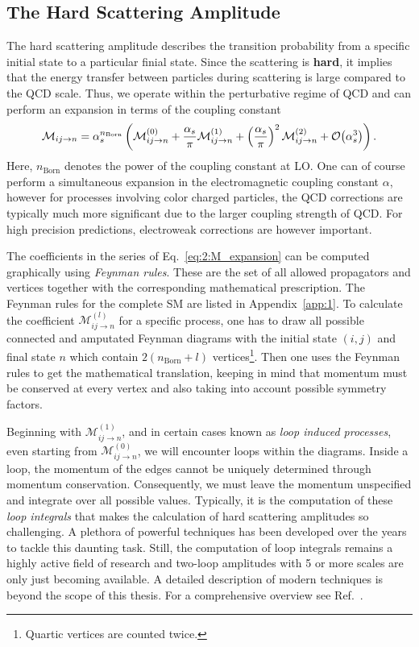 \subsection{The Hard Scattering Amplitude}
The hard scattering amplitude describes the transition probability from a specific initial state to a particular finial state. Since the scattering is \textbf{hard}, it implies that the energy transfer between particles during scattering is large compared to the \acs{QCD} scale. Thus, we operate within the perturbative regime of \acs{QCD} and can perform an expansion in terms of the coupling constant
\begin{equation}
\mathcal{M}_{ij \rightarrow n} = \alpha_s^{n_\text{Born}} \left( \mathcal{M}_{ij \rightarrow n}^{(0)} + \frac{\alpha_s}{\pi} \mathcal{M}_{ij \rightarrow n}^{(1)} + \left(\frac{\alpha_s}{\pi}\right)^2 \mathcal{M}_{ij \rightarrow n}^{(2)} + \mathcal{O}\!\left(\alpha_s^3\right) \right).
\label{eq:2:M_expansion}
\end{equation}
Here, $n_\text{Born}$ denotes the power of the coupling constant at \acs{LO}. One can of course perform a simultaneous expansion in the electromagnetic coupling constant $\alpha$, however for processes involving color charged particles, the \acs{QCD} corrections are typically much more significant due to the larger coupling strength of \acs{QCD}. For high precision predictions, electroweak corrections are however important.

The coefficients in the series of Eq.~\eqref{eq:2:M_expansion} can be computed graphically using \textit{Feynman rules}. These are the set of all allowed propagators and vertices together with the corresponding mathematical prescription. The Feynman rules for the complete \acs{SM} are listed in Appendix~\ref{app:1}. To calculate the coefficient $\mathcal{M}_{ij \rightarrow n}^{(l)}$ for a specific process, one has to draw all possible connected and amputated Feynman diagrams with the initial state $(i,j)$ and final state $n$ which contain $2(n_\text{Born} + l)$ vertices\footnote{Quartic vertices are counted twice.}. Then one uses the Feynman rules to get the mathematical translation, keeping in mind that momentum must be conserved at every vertex and also taking into account possible symmetry factors.

Beginning with $\mathcal{M}^{(1)}_{ij \rightarrow n}$, and in certain cases known as \textit{loop induced processes}, even starting from $\mathcal{M}^{(0)}_{ij \rightarrow n}$, we will encounter loops within the diagrams. Inside a loop, the momentum of the edges cannot be uniquely determined through momentum conservation. Consequently, we must leave the momentum unspecified and integrate over all possible values. Typically, it is the computation of these \textit{loop integrals} that makes the calculation of hard scattering amplitudes so challenging. A plethora of powerful techniques has been developed over the years to tackle this daunting task. Still, the computation of loop integrals remains a highly active field of research and two-loop amplitudes with 5 or more scales are only just becoming available. A detailed description of modern techniques is beyond the scope of this thesis. For a comprehensive overview see Ref.~\cite{Weinzierl:2022eaz}.

